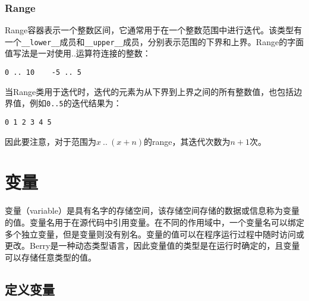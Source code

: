 \subsubsection{Range}

Range容器表示一个整数区间，它通常用于在一个整数范围中进行迭代。该类型有一个\texttt{\_\_lower\_\_}成员和\texttt{\_\_upper\_\_}成员，分别表示范围的下界和上界。Range的字面值写法是一对使用..运算符连接的整数：
\begin{lstlisting}[language=berry, numbers=none]
0 .. 10    -5 .. 5
\end{lstlisting}

当Range类用于迭代时，迭代的元素为从下界到上界之间的所有整数值，也包括边界值，例如\texttt{0..5}的迭代结果为：
\begin{lstlisting}[language=berry, numbers=none]
0 1 2 3 4 5
\end{lstlisting}
因此要注意，对于范围为$x\ ..\ (x+n)$的range，其迭代次数为$n+1$次。

\section{变量}

变量（variable）是具有名字的存储空间，该存储空间存储的数据或信息称为变量的值。变量名用于在源代码中引用变量。在不同的作用域中，一个变量名可以绑定多个独立变量，但是变量则没有别名。变量的值可以在程序运行过程中随时访问或更改。Berry是一种动态类型语言，因此变量值的类型是在运行时确定的，且变量可以存储任意类型的值。

\subsection{定义变量}

